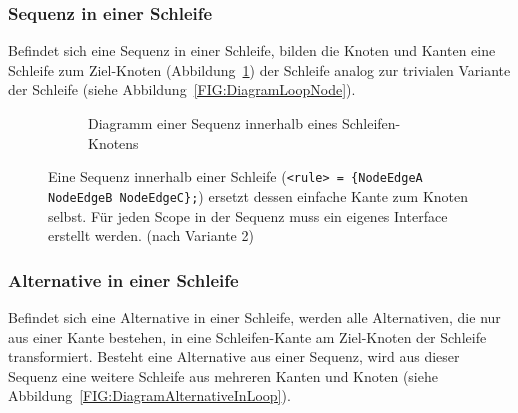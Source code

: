 \documentclass[../InterneDSLs.tex]{subfiles}
\begin{document}
\subsubsection{Sequenz in einer Schleife}
Befindet sich eine Sequenz in einer Schleife, bilden die Knoten und Kanten eine Schleife zum Ziel-Knoten (Abbildung~\ref{FIG:DiagramSequenceInLoop}) der Schleife analog zur trivialen Variante der Schleife (siehe Abbildung~\ref{FIG:DiagramLoopNode}).
\begin{figure}[ht]
\centering
  \begin{subfigure}[c]{0.49\textwidth}
    \caption{Diagramm einer Sequenz innerhalb eines Schleifen-Knotens}
    \label{FIG:DiagramSequenceInLoop}
  \end{subfigure}
  \begin{subfigure}[c]{0.49\textwidth}
    
  \end{subfigure}
  \caption[Abbildung einer Sequenz innerhalb einer Schleife]{Eine Sequenz innerhalb einer Schleife (\texttt{<rule> = \{NodeEdgeA NodeEdgeB NodeEdgeC\};}) ersetzt dessen einfache Kante zum Knoten selbst. Für jeden Scope in der Sequenz muss ein eigenes Interface erstellt werden. (nach Variante 2)}
  \label{FIG:SequenceInLoop}
\end{figure}

\subsubsection{Alternative in einer Schleife}
Befindet sich eine Alternative in einer Schleife, werden alle Alternativen, die nur aus einer Kante bestehen, in eine Schleifen-Kante am Ziel-Knoten der Schleife transformiert. Besteht eine Alternative aus einer Sequenz, wird aus dieser Sequenz eine weitere Schleife aus mehreren Kanten und Knoten (siehe Abbildung~\ref{FIG:DiagramAlternativeInLoop}).
\end{document}
